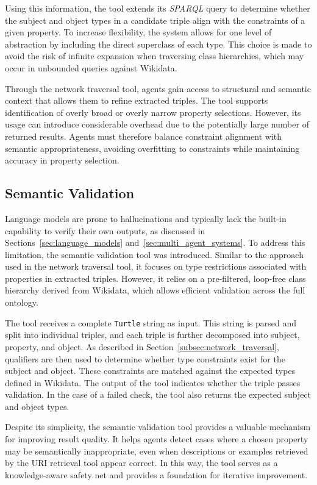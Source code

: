 \documentclass[a4paper,oneside,bibliography=totoc]{scrbook}
\begin{document}
Using this information, the tool extends its \textit{SPARQL} query to determine whether the subject and object types in a candidate triple align with the constraints of a given property. To increase flexibility, the system allows for one level of abstraction by including the direct superclass of each type. This choice is made to avoid the risk of infinite expansion when traversing class hierarchies, which may occur in unbounded queries against Wikidata.

Through the network traversal tool, agents gain access to structural and semantic context that allows them to refine extracted triples. The tool supports identification of overly broad or overly narrow property selections. However, its usage can introduce considerable overhead due to the potentially large number of returned results. Agents must therefore balance constraint alignment with semantic appropriateness, avoiding overfitting to constraints while maintaining accuracy in property selection.

\subsection{Semantic Validation}
\label{subsec:semantic_validation}

Language models are prone to hallucinations and typically lack the built-in capability to verify their own outputs, as discussed in Sections~\ref{sec:language_models} and~\ref{sec:multi_agent_systems}. To address this limitation, the semantic validation tool was introduced. Similar to the approach used in the network traversal tool, it focuses on type restrictions associated with properties in extracted triples. However, it relies on a pre-filtered, loop-free class hierarchy derived from Wikidata, which allows efficient validation across the full ontology.

The tool receives a complete \texttt{Turtle} string as input. This string is parsed and split into individual triples, and each triple is further decomposed into subject, property, and object. As described in Section~\ref{subsec:network_traversal}, qualifiers are then used to determine whether type constraints exist for the subject and object. These constraints are matched against the expected types defined in Wikidata. The output of the tool indicates whether the triple passes validation. In the case of a failed check, the tool also returns the expected subject and object types.

Despite its simplicity, the semantic validation tool provides a valuable mechanism for improving result quality. It helps agents detect cases where a chosen property may be semantically inappropriate, even when descriptions or examples retrieved by the URI retrieval tool appear correct. In this way, the tool serves as a knowledge-aware safety net and provides a foundation for iterative improvement.
\end{document}
